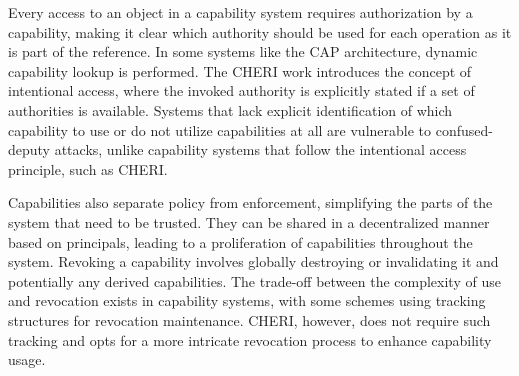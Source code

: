 Every access to an object in a capability system requires authorization by a capability, making 
it clear which authority should be used for each operation as it is part of the reference. 
In some systems like the CAP architecture, dynamic capability lookup is performed. 
The CHERI work introduces the concept of intentional access, where the invoked authority 
is explicitly stated if a set of authorities is available. Systems that lack explicit 
identification of which capability to use or do not utilize capabilities at all are 
vulnerable to confused-deputy attacks, unlike capability systems that follow the 
intentional access principle, such as CHERI.
\newline

Capabilities also separate policy from enforcement, simplifying the parts of the 
system that need to be trusted. They can be shared in a decentralized manner 
based on principals, leading to a proliferation of capabilities throughout 
the system. Revoking a capability involves globally destroying or invalidating 
it and potentially any derived capabilities. The trade-off between the complexity 
of use and revocation exists in capability systems, with some schemes using 
tracking structures for revocation maintenance. CHERI, however, does not require 
such tracking and opts for a more intricate revocation process to enhance capability usage.
\newline


